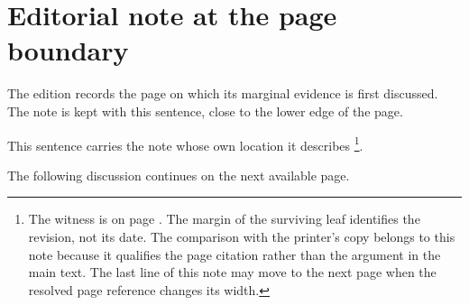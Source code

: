 \documentclass{article}
\begin{document}
\section*{Editorial note at the page boundary}
The edition records the page on which its marginal evidence is first discussed.
The note is kept with this sentence, close to the lower edge of the page.

\vspace*{0.70\textheight}
\noindent This sentence carries the note whose own location it describes%
\footnote{\label{fn:boundary}The witness is on page \pageref{fn:boundary}.
The margin of the surviving leaf identifies the revision, not its date.
The comparison with the printer's copy belongs to this note because it
qualifies the page citation rather than the argument in the main text.
The last line of this note may move to the next page when the resolved
page reference changes its width.}.

\noindent The following discussion continues on the next available page.
\end{document}
